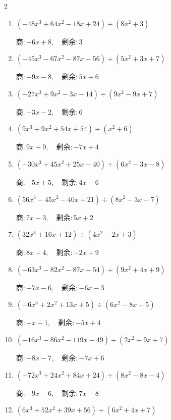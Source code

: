 \begin{multicols}{2}
\begin{enumerate}
  \item $(-48x^{3}+64x^{2}-18x+24) \div (8x^{2}+3)$

        $商 : -6x+8, \quad 剰余 : 3$

  \item $(-45x^{3}-67x^{2}-87x-56) \div (5x^{2}+3x+7)$

        $商 : -9x-8, \quad 剰余 : 5x+6$

\columnbreak %

  \item $(-27x^{3}+9x^{2}-3x-14) \div (9x^{2}-9x+7)$

        $商 : -3x-2, \quad 剰余 : 6$

  \item $(9x^{3}+9x^{2}+54x+54) \div (x^{2}+6)$

        $商 : 9x+9, \quad 剰余 : -7x+4$

  \item $(-30x^{3}+45x^{2}+25x-40) \div (6x^{2}-3x-8)$

        $商 : -5x+5, \quad 剰余 : 4x-6$

  \item $(56x^{3}-45x^{2}-40x+21) \div (8x^{2}-3x-7)$

        $商 : 7x-3, \quad 剰余 : 5x+2$

  \item $(32x^{3}+16x+12) \div (4x^{2}-2x+3)$

        $商 : 8x+4, \quad 剰余 : -2x+9$

\columnbreak %

\resetques

  \item $(-63x^{3}-82x^{2}-87x-54) \div (9x^{2}+4x+9)$

        $商 : -7x-6, \quad 剰余 : -6x-3$

  \item $(-6x^{3}+2x^{2}+13x+5) \div (6x^{2}-8x-5)$

        $商 : -x-1, \quad 剰余 : -5x+4$

  \item $(-16x^{3}-86x^{2}-119x-49) \div (2x^{2}+9x+7)$

        $商 : -8x-7, \quad 剰余 : -7x+6$

  \item $(-72x^{3}+24x^{2}+84x+24) \div (8x^{2}-8x-4)$

        $商 : -9x-6, \quad 剰余 : 7x-8$

  \item $(6x^{3}+52x^{2}+39x+56) \div (6x^{2}+4x+7)$


\end{enumerate}
\end{multicols}
